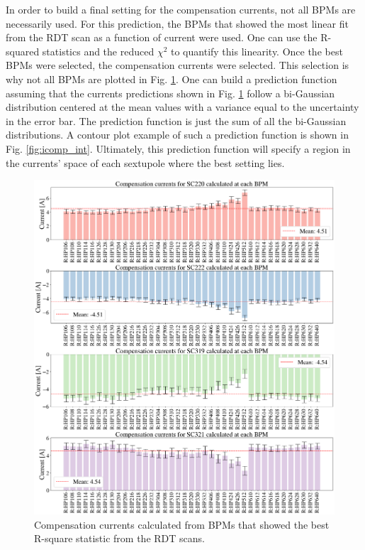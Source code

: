 In order to build a final setting for the compensation currents, not all BPMs are necessarily used. For this prediction, the BPMs that showed the most linear fit from the RDT scan as a function of current were used. One can use the R-squared statistics and the reduced $\chi^2$ to quantify this linearity. Once the best BPMs were selected, the compensation currents were selected. This selection is why not all BPMs are plotted in Fig. \ref{fig:icomp}. One can build a prediction function assuming that the currents predictions shown in Fig. \ref{fig:icomp} follow a bi-Gaussian distribution centered at the mean values with a variance equal to the uncertainty in the error bar. The prediction function is just the sum of all the bi-Gaussian distributions. A contour plot example of such a prediction function is shown in Fig. \ref{fig:icomp_int}. Ultimately, this prediction function will specify a region in the currents' space of each sextupole where the best setting lies.

\begin{figure}[H]
    \centering
    \includegraphics[width=\columnwidth]{chapter4/comp_currents.png}
    \caption{Compensation currents calculated from BPMs that showed the best R-square statistic from the RDT scans.}
    \label{fig:icomp}
\end{figure}

